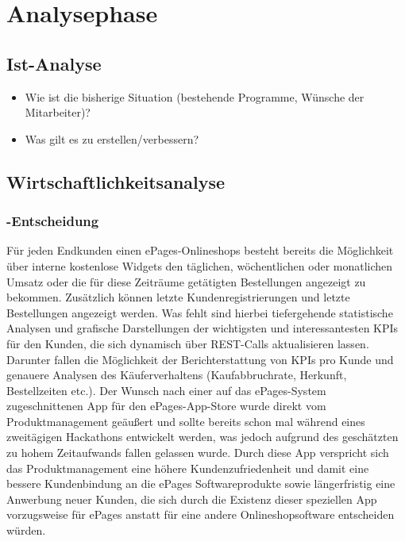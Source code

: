 \section{Analysephase} 
\label{sec:Analysephase}


\subsection{Ist-Analyse} 
\label{sec:IstAnalyse}
\begin{itemize}
	\item Wie ist die bisherige Situation (\zB bestehende Programme, Wünsche der Mitarbeiter)?
	\item Was gilt es zu erstellen/verbessern?
\end{itemize}


\subsection{Wirtschaftlichkeitsanalyse}
\label{sec:Wirtschaftlichkeitsanalyse}

\subsubsection{-Entscheidung}
\label{sec:MakeOrBuyEntscheidung}

Für jeden Endkunden einen ePages-Onlineshops besteht bereits die Möglichkeit über interne kostenlose Widgets den täglichen, wöchentlichen oder monatlichen Umsatz oder die für diese Zeiträume getätigten Bestellungen angezeigt zu bekommen. Zusätzlich können letzte Kundenregistrierungen und letzte Bestellungen angezeigt werden.
Was fehlt sind hierbei tiefergehende statistische Analysen und grafische Darstellungen der wichtigsten und interessantesten KPIs für den Kunden, die sich dynamisch über REST-Calls aktualisieren lassen. Darunter fallen die Möglichkeit der Berichterstattung von KPIs pro Kunde und genauere Analysen des Käuferverhaltens (Kaufabbruchrate, Herkunft, Bestellzeiten etc.). Der Wunsch nach einer auf das ePages-System zugeschnittenen App für den ePages-App-Store wurde direkt vom Produktmanagement geäußert und sollte bereits schon mal während eines zweitägigen Hackathons entwickelt werden, was jedoch aufgrund des geschätzten zu hohem Zeitaufwands fallen gelassen wurde. Durch diese App verspricht sich das Produktmanagement eine höhere Kundenzufriedenheit und damit eine bessere Kundenbindung an die ePages Softwareprodukte sowie längerfristig eine Anwerbung neuer Kunden, die sich durch die Existenz dieser speziellen App vorzugsweise für ePages anstatt für eine andere Onlineshopsoftware entscheiden würden.
